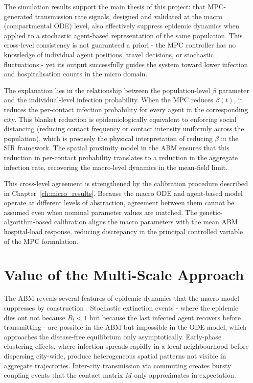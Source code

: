 The simulation results support the main thesis of this project: that MPC-generated transmission rate signals, designed and validated at the macro (compartmental ODE) level, also effectively suppress epidemic dynamics when applied to a stochastic agent-based representation of the same population.
This cross-level consistency is not guaranteed a priori - the MPC controller has no knowledge of individual agent positions, travel decisions, or stochastic fluctuations - yet its output successfully guides the system toward lower infection and hospitalisation counts in the micro domain.

The explanation lies in the relationship between the population-level $\beta$ parameter and the individual-level infection probability.
When the MPC reduces $\beta(t)$, it reduces the per-contact infection probability for every agent in the corresponding city.
This blanket reduction is epidemiologically equivalent to enforcing social distancing (reducing contact frequency or contact intensity uniformly across the population), which is precisely the physical interpretation of reducing $\beta$ in the SIR framework.
The spatial proximity model in the ABM ensures that this reduction in per-contact probability translates to a reduction in the aggregate infection rate, recovering the macro-level dynamics in the mean-field limit.

This cross-level agreement is strengthened by the calibration procedure described in Chapter~\ref{ch:micro_results}.
Because the macro ODE and agent-based model operate at different levels of abstraction, agreement between them cannot be assumed even when nominal parameter values are matched.
The genetic-algorithm-based calibration aligns the macro parameters with the mean ABM hospital-load response, reducing discrepancy in the principal controlled variable of the MPC formulation.

\section{Value of the Multi-Scale Approach}
\label{sec:disc_multiscale}

The ABM reveals several features of epidemic dynamics that the macro model suppresses by construction \citep{polcz2025}.
Stochastic extinction events - where the epidemic dies out not because $R_t < 1$ but because the last infected agent recovers before transmitting - are possible in the ABM but impossible in the ODE model, which approaches the disease-free equilibrium only asymptotically.
Early-phase clustering effects, where infection spreads rapidly in a local neighbourhood before dispersing city-wide, produce heterogeneous spatial patterns not visible in aggregate trajectories.
Inter-city transmission via commuting creates bursty coupling events that the contact matrix $M$ only approximates in expectation.

